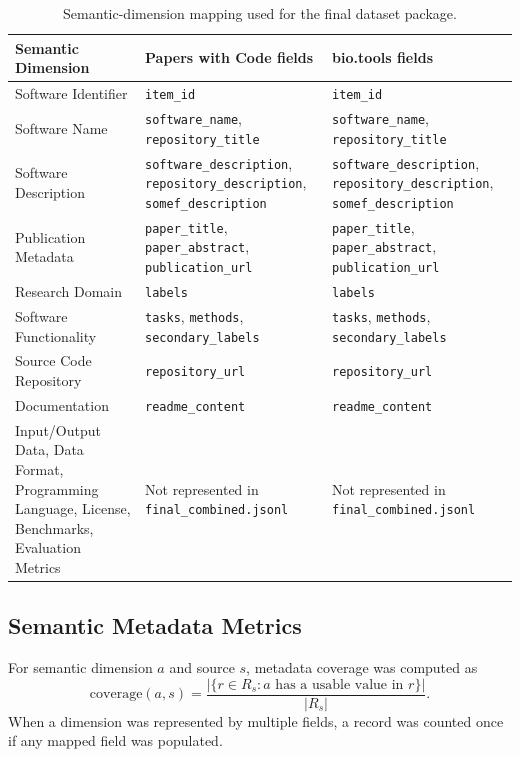 \documentclass[pdflatex,sn-mathphys-num]{sn-jnl}%
\theoremstyle{thmstyleone}%
\theoremstyle{thmstyletwo}%
\theoremstyle{thmstylethree}%
\begin{document}
\begin{table}[htbp]
\centering
\small
\caption{Semantic-dimension mapping used for the final dataset package.}
\label{tab:semantic-crosswalk}
\begin{tabularx}{\textwidth}{p{3.4cm}XX}
\toprule
Semantic Dimension & Papers with Code fields & bio.tools fields \\
\midrule
Software Identifier & \texttt{item\_id} & \texttt{item\_id} \\
Software Name & \texttt{software\_name}, \texttt{repository\_title} & \texttt{software\_name}, \texttt{repository\_title} \\
Software Description & \texttt{software\_description}, \texttt{repository\_description}, \texttt{somef\_description} & \texttt{software\_description}, \texttt{repository\_description}, \texttt{somef\_description} \\
Publication Metadata & \texttt{paper\_title}, \texttt{paper\_abstract}, \texttt{publication\_url} & \texttt{paper\_title}, \texttt{paper\_abstract}, \texttt{publication\_url} \\
Research Domain & \texttt{labels} & \texttt{labels} \\
Software Functionality & \texttt{tasks}, \texttt{methods}, \texttt{secondary\_labels} & \texttt{tasks}, \texttt{methods}, \texttt{secondary\_labels} \\
Source Code Repository & \texttt{repository\_url} & \texttt{repository\_url} \\
Documentation & \texttt{readme\_content} & \texttt{readme\_content} \\
Input/Output Data, Data Format, Programming Language, License, Benchmarks, Evaluation Metrics & Not represented in \texttt{final\_combined.jsonl} & Not represented in \texttt{final\_combined.jsonl} \\
\bottomrule
\end{tabularx}
\end{table}

\subsection{Semantic Metadata Metrics}
\label{subsec:semantic-metrics}

For semantic dimension \(a\) and source \(s\), metadata coverage was computed as
\[
\mathrm{coverage}(a,s)=\frac{\left|\{r \in R_s : a \text{ has a usable value in } r\}\right|}{|R_s|}.
\]
When a dimension was represented by multiple fields, a record was counted once if any mapped field was populated.
\end{document}

